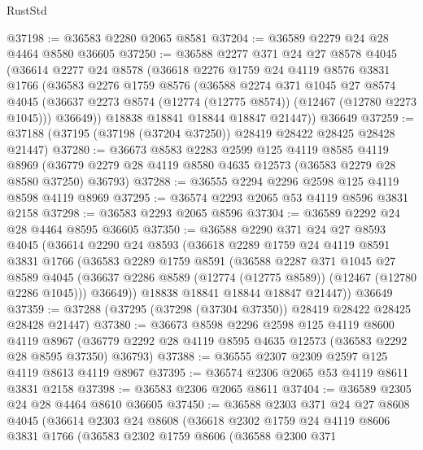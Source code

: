 \begin{lexlean}{RustStd}
\begin{coremodule}
@37198 := @36583 @2280 @2065 @8581
@37204 := @36589 @2279 @24 @28 @4464 @8580 @36605
@37250 := @36588
    @2277
    @371
    @24
    @27
    @8578
    @4045
    (@36614
      @2277
      @24
      @8578
      (@36618
        @2276
        @1759
        @24
        @4119
        @8576
        @3831
        @1766
        (@36583
          @2276
          @1759
          @8576
          (@36588
            @2274
            @371
            @1045
            @27
            @8574
            @4045
            (@36637 @2273 @8574 (@12774 (@12775 @8574)) (@12467 (@12780 @2273 @1045)))
            @36649))
        @18838
        @18841
        @18844
        @18847
        @21447))
    @36649
@37259 := @37188 (@37195 (@37198 (@37204 @37250)) @28419 @28422 @28425 @28428 @21447)
@37280 := @36673
    @8583
    @2283
    @2599
    @125
    @4119
    @8585
    @4119
    @8969
    (@36779 @2279 @28 @4119 @8580 @4635 @12573 (@36583 @2279 @28 @8580 @37250) @36793)
@37288 := @36555 @2294 @2296 @2598 @125 @4119 @8598 @4119 @8969
@37295 := @36574 @2293 @2065 @53 @4119 @8596 @3831 @2158
@37298 := @36583 @2293 @2065 @8596
@37304 := @36589 @2292 @24 @28 @4464 @8595 @36605
@37350 := @36588
    @2290
    @371
    @24
    @27
    @8593
    @4045
    (@36614
      @2290
      @24
      @8593
      (@36618
        @2289
        @1759
        @24
        @4119
        @8591
        @3831
        @1766
        (@36583
          @2289
          @1759
          @8591
          (@36588
            @2287
            @371
            @1045
            @27
            @8589
            @4045
            (@36637 @2286 @8589 (@12774 (@12775 @8589)) (@12467 (@12780 @2286 @1045)))
            @36649))
        @18838
        @18841
        @18844
        @18847
        @21447))
    @36649
@37359 := @37288 (@37295 (@37298 (@37304 @37350)) @28419 @28422 @28425 @28428 @21447)
@37380 := @36673
    @8598
    @2296
    @2598
    @125
    @4119
    @8600
    @4119
    @8967
    (@36779 @2292 @28 @4119 @8595 @4635 @12573 (@36583 @2292 @28 @8595 @37350) @36793)
@37388 := @36555 @2307 @2309 @2597 @125 @4119 @8613 @4119 @8967
@37395 := @36574 @2306 @2065 @53 @4119 @8611 @3831 @2158
@37398 := @36583 @2306 @2065 @8611
@37404 := @36589 @2305 @24 @28 @4464 @8610 @36605
@37450 := @36588
    @2303
    @371
    @24
    @27
    @8608
    @4045
    (@36614
      @2303
      @24
      @8608
      (@36618
        @2302
        @1759
        @24
        @4119
        @8606
        @3831
        @1766
        (@36583
          @2302
          @1759
          @8606
          (@36588
            @2300
            @371

\end{coremodule}
\end{lexlean}
